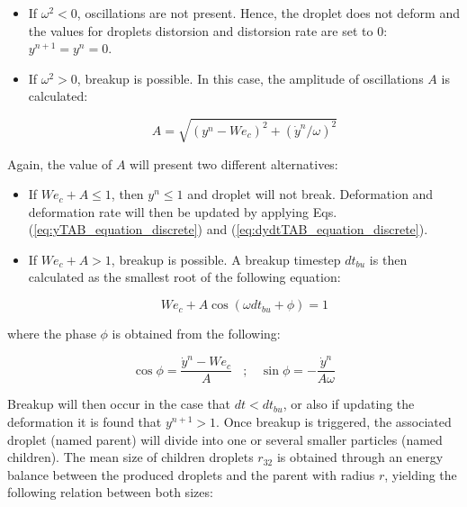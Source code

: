 \begin{itemize}

	\item If $\omega^2 < 0$, oscillations are not present. Hence, the droplet does not deform and the values for droplets distorsion and distorsion rate are set to $0$: $y^{n+1} = y^n = 0$.
	
	\item If $\omega^2 > 0$, breakup is possible. In this case, the amplitude of oscillations $A$ is calculated:
	
	\begin{equation}
	A = \sqrt{\left( y^n - We_c \right)^2 + \left( \dot{y}^n / \omega \right)^2}
	\end{equation}

\end{itemize}

Again, the value of $A$ will present two different alternatives:

\begin{itemize}

	\item If $We_c + A \leq 1$, then $y^n \leq 1$ and droplet will not break. Deformation and deformation rate will then be updated by applying Eqs. (\ref{eq:yTAB_equation_discrete}) and (\ref{eq:dydtTAB_equation_discrete}).
	
	\item If $We_c + A > 1$, breakup is possible. A breakup timestep $dt_{bu}$ is then calculated as the smallest root of the following equation:
	
	\begin{equation}
	\label{eq:TAB_dtbu_obtention}
	We_c + A \cos \left( \omega dt_{bu} + \phi  \right) = 1
	\end{equation}

\end{itemize}

where the phase $\phi$ is obtained from the following:

\begin{equation}
\cos \phi = \frac{\dot{y}^n - We_c}{A} ~~~~ ; ~~~~ \sin \phi = - \frac{\dot{y}^n}{A \omega}
\end{equation}

Breakup will then occur in the case that $dt < dt_{bu}$, or also if updating the deformation it is found that $y^{n+1} > 1$. Once breakup is triggered, the associated droplet (named parent) will divide into one or several smaller particles (named children). The mean size of children droplets $r_{32}$ is obtained through an energy balance between the produced droplets and the parent with radius $r$, yielding the following relation between both sizes:

